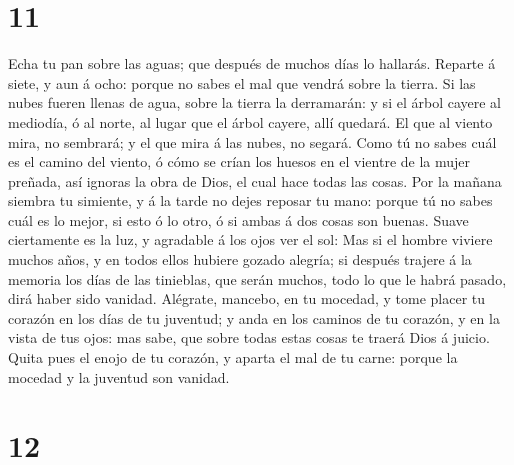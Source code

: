 \hypertarget{section-10}{%
\section{11}\label{section-10}}

 Echa tu pan sobre las aguas; que después de muchos días
lo hallarás.  Reparte á siete, y aun á ocho: porque no
sabes el mal que vendrá sobre la tierra.  Si las nubes
fueren llenas de agua, sobre la tierra la derramarán: y si el árbol
cayere al mediodía, ó al norte, al lugar que el árbol cayere, allí
quedará.  El que al viento mira, no sembrará; y el que
mira á las nubes, no segará.  Como tú no sabes cuál es el
camino del viento, ó cómo se crían los huesos en el vientre de la mujer
preñada, así ignoras la obra de Dios, el cual hace todas las cosas.
 Por la mañana siembra tu simiente, y á la tarde no dejes
reposar tu mano: porque tú no sabes cuál es lo mejor, si esto ó lo otro,
ó si ambas á dos cosas son buenas.  Suave ciertamente es
la luz, y agradable á los ojos ver el sol:  Mas si el
hombre viviere muchos años, y en todos ellos hubiere gozado alegría; si
después trajere á la memoria los días de las tinieblas, que serán
muchos, todo lo que le habrá pasado, dirá haber sido vanidad.
 Alégrate, mancebo, en tu mocedad, y tome placer tu
corazón en los días de tu juventud; y anda en los caminos de tu corazón,
y en la vista de tus ojos: mas sabe, que sobre todas estas cosas te
traerá Dios á juicio.  Quita pues el enojo de tu corazón,
y aparta el mal de tu carne: porque la mocedad y la juventud son
vanidad.

\hypertarget{section-11}{%
\section{12}\label{section-11}}

